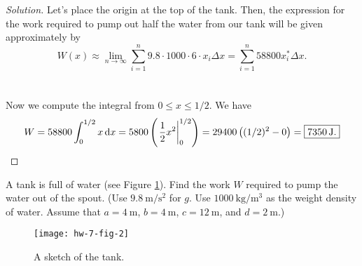 \begin{proof}[Solution]
Let's place the origin at the top of the tank. Then, the expression for the
work required to pump out half the water from our tank will be given
approximately by
\[
W(x)\approx\lim_{n\to\infty}\sum_{i=1}^n9.8\cdot1000\cdot 6\cdot x_i\Delta
x=\boxed{\sum_{i=1}^{n}58800 x_i^*\Delta x.}
\]
\\\\
Now we compute the integral from $0\leq x\leq 1/2$. We have
\[
W=58800\int_0^{1/2} x\,\mathrm{d} x=5800\left(\left.\frac{1}{2}x^2\right|_0^{1/2} \right)=29400\left((1/2)^2-0\right)=\boxed{\SI{7350}{\joule}.}
\]
\end{proof}

\begin{problem}[WebAssign, HW8, 6]
A tank is full of water (see Figure \ref{fig:hw-7-2}). Find the work $W$
required to pump the water out of the spout. (Use
$\SI{9.8}{\meter/\second^2}$ for $g$. Use $\SI{1000}{\kilo\gram/\meter^3}$
as the weight density  of water. Assume that $a=\SI{4}{\meter}$,
$b=\SI{4}{\meter}$, $c=\SI{12}{\meter}$, and $d=\SI{2}{\meter}$.)
\begin{figure}[htbp]
  \centering
  \texttt{[image: hw-7-fig-2]}
  \caption{A sketch of the tank.}
  \label{fig:hw-7-2}
\end{figure}
\end{problem}
